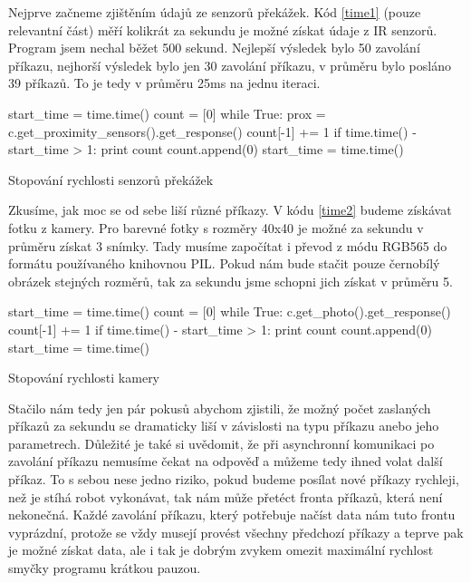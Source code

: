 \documentclass[12pt,notitlepage]{report}
\begin{document}
    Nejprve začneme zjištěním údajů ze senzorů překážek. Kód \ref{time1} (pouze
    relevantní část) měří kolikrát za sekundu je možné získat údaje z IR
    senzorů. Program jsem nechal běžet 500 sekund. Nejlepší výsledek bylo 50
    zavolání příkazu, nejhorší výsledek bylo jen 30 zavolání příkazu, v průměru
    bylo posláno 39 příkazů. To je tedy v průměru 25ms na jednu iteraci.

\begin{listing}
\begin{pyc}
start_time = time.time()
count = [0]
while True:
    prox = c.get_proximity_sensors().get_response()
    count[-1] += 1
    if time.time() - start_time > 1:
        print count
        count.append(0)
        start_time = time.time()
\end{pyc}
\caption{Stopování rychlosti senzorů překážek}
\label{time1}
\end{listing}

    Zkusíme, jak moc se od sebe liší různé příkazy. V kódu \ref{time2} budeme
    získávat fotku z kamery. Pro barevné fotky s rozměry 40x40 je možné za
    sekundu v průměru získat 3 snímky. Tady musíme započítat i převod z módu
    RGB565 do formátu používaného knihovnou PIL. Pokud nám bude stačit pouze
    černobílý obrázek stejných rozměrů, tak za sekundu jsme schopni jich získat
    v průměru 5.

\begin{listing}
\begin{pyc}
start_time = time.time()
count = [0]
while True:
    c.get_photo().get_response()
    count[-1] += 1
    if time.time() - start_time > 1:
        print count
        count.append(0)
        start_time = time.time()
        \end{pyc}
\caption{Stopování rychlosti kamery}
\label{time2}
\end{listing}

    Stačilo nám tedy jen pár pokusů abychom zjistili, že možný počet zaslaných
    příkazů za sekundu se dramaticky liší v závislosti na typu příkazu anebo
    jeho parametrech. Důležité je také si uvědomit, že při asynchronní
    komunikaci po zavolání příkazu nemusíme čekat na odpověď a můžeme tedy
    ihned volat další příkaz. To s sebou nese jedno riziko, pokud budeme
    posílat nové příkazy rychleji, než je stíhá robot vykonávat, tak nám může
    přetéct fronta příkazů, která není nekonečná. Každé zavolání příkazu, který
    potřebuje načíst data nám tuto frontu vyprázdní, protože se vždy musejí
    provést všechny předchozí příkazy a teprve pak je možné získat data, ale i
    tak je dobrým zvykem omezit maximální rychlost smyčky programu krátkou
    pauzou.
\end{document}
